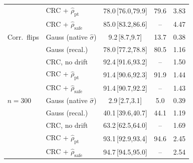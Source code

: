 \begin{table}[!htbp]
{\begin{tabular}{llccc}
 & CRC + $\hat\rho_{\mathrm{pt}}$ & 78.0\,{\scriptsize[76.0,79.9]} & 79.6 & 3.83\\
 & CRC + $\hat\rho_{\mathrm{safe}}$ & 85.0\,{\scriptsize[83.2,86.6]} & -- & 4.47\\
\midrule
Corr.\ flips & Gauss (native $\hat\sigma$) & 9.2\,{\scriptsize[8.7,9.7]} & 13.7 & 0.38\\
 & Gauss (recal.) & 78.0\,{\scriptsize[77.2,78.8]} & 80.5 & 1.16\\
 & CRC, no drift & 92.4\,{\scriptsize[91.6,93.2]} & -- & 1.50\\
 & CRC + $\hat\rho_{\mathrm{pt}}$ & 91.4\,{\scriptsize[90.6,92.3]} & 91.9 & 1.44\\
 & CRC + $\hat\rho_{\mathrm{safe}}$ & 91.4\,{\scriptsize[90.7,92.2]} & -- & 1.43\\
\midrule
$n{=}300$ & Gauss (native $\hat\sigma$) & 2.9\,{\scriptsize[2.7,3.1]} & 5.0 & 0.39\\
 & Gauss (recal.) & 40.1\,{\scriptsize[39.6,40.7]} & 44.1 & 1.19\\
 & CRC, no drift & 63.2\,{\scriptsize[62.5,64.0]} & -- & 1.69\\
 & CRC + $\hat\rho_{\mathrm{pt}}$ & 93.1\,{\scriptsize[92.9,93.4]} & 94.6 & 2.45\\
 & CRC + $\hat\rho_{\mathrm{safe}}$ & 94.7\,{\scriptsize[94.5,95.0]} & -- & 2.54\\
\bottomrule
\end{tabular}}
\end{table}
